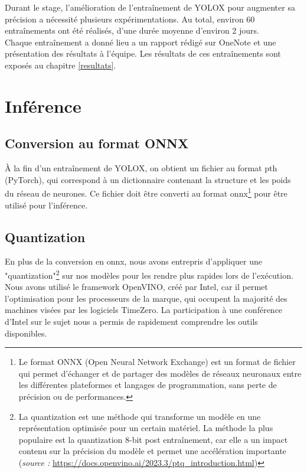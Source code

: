 Durant le stage, l'amélioration de l'entraînement de YOLOX pour augmenter sa précision
a nécessité plusieurs expérimentations. Au total, environ 60 entraînements ont été réalisés,
d'une durée moyenne d'environ 2 jours. \\

Chaque entraînement a donné lieu a un rapport rédigé sur OneNote et une présentation des
résultats à l'équipe. Les résultats de ces entraînements sont exposés au chapitre \ref{resultats}.

\section{Inférence}

\subsection{Conversion au format ONNX}

À la fin d'un entraînement de YOLOX, on obtient un fichier au format pth (PyTorch),
qui correspond à un dictionnaire contenant la structure et les poids du réseau de neurones.
Ce fichier doit être converti au format onnx\footnote{
Le format ONNX (Open Neural Network Exchange) est un format de fichier qui permet d'échanger
et de partager des modèles de réseaux neuronaux entre les différentes plateformes et
langages de programmation, sans perte de précision ou de performances.}
pour être utilisé pour l'inférence.\\

\subsection{Quantization}

En plus de la conversion en onnx, nous avons entrepris d'appliquer une
"quantization"\footnote{La quantization est une méthode qui transforme un modèle en une représentation
optimisée pour un certain matériel. La méthode la plus populaire est la quantization
8-bit post entraînement, car elle a un impact contenu sur la précision du modèle
et permet une accélération importante (\textit{source : }
\url{https://docs.openvino.ai/2023.3/ptq_introduction.html})}
sur nos modèles pour les rendre plus rapides lors de l'exécution.\\

Nous avons utilisé le framework OpenVINO, créé par Intel, car il permet l'optimisation pour
les processeurs de la marque, qui occupent la majorité des machines visées par les logiciels TimeZero.
La participation à une conférence d'Intel sur le sujet nous a permis de rapidement
comprendre les outils disponibles. \\

